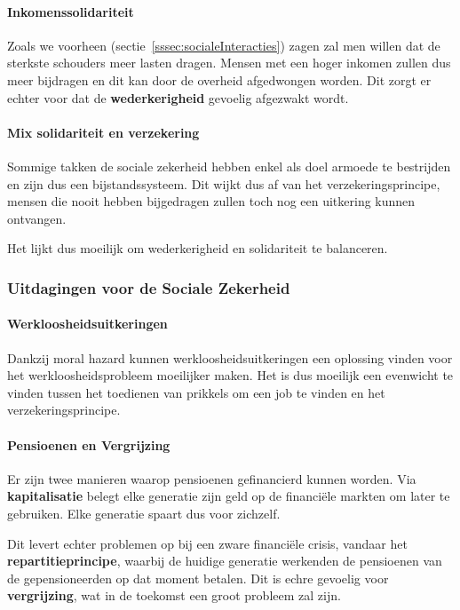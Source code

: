 \paragraph{Inkomenssolidariteit} Zoals we voorheen (sectie~\ref{sssec:socialeInteracties}) zagen zal men willen dat de sterkste schouders meer lasten dragen. Mensen met een hoger inkomen zullen dus meer bijdragen en dit kan door de overheid afgedwongen worden. Dit zorgt er echter voor dat de \textbf{wederkerigheid} gevoelig afgezwakt wordt.

\paragraph{Mix solidariteit en verzekering} Sommige takken de sociale zekerheid hebben enkel als doel armoede te bestrijden en zijn dus een bijstandssysteem. Dit wijkt dus af van het verzekeringsprincipe, mensen die nooit hebben bijgedragen zullen toch nog een uitkering kunnen ontvangen.

Het lijkt dus moeilijk om wederkerigheid en solidariteit te balanceren.

\subsubsection{Uitdagingen voor de Sociale Zekerheid}

\paragraph{Werkloosheidsuitkeringen} Dankzij moral hazard kunnen werkloosheidsuitkeringen een oplossing vinden voor het werkloosheidsprobleem moeilijker maken. Het is dus moeilijk een evenwicht te vinden tussen het toedienen van prikkels om een job te vinden en het verzekeringsprincipe.

\paragraph{Pensioenen en Vergrijzing} Er zijn twee manieren waarop pensioenen gefinancierd kunnen worden. Via \textbf{kapitalisatie} belegt elke generatie zijn geld op de financi\"ele markten om later te gebruiken. Elke generatie spaart dus voor zichzelf.

Dit levert echter problemen op bij een zware financi\"ele crisis, vandaar het \textbf{repartitieprincipe}, waarbij de huidige generatie werkenden de pensioenen van de gepensioneerden op dat moment betalen. Dit is echre gevoelig voor \textbf{vergrijzing}, wat in de toekomst een groot probleem zal zijn.

